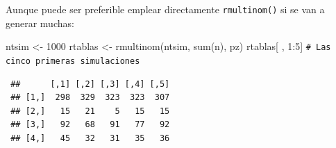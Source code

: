 \documentclass[
]{book}
\newenvironment{Shaded}{\begin{snugshade}}{\end{snugshade}}
\newcommand{\CommentTok}[1]{\textcolor[rgb]{0.56,0.35,0.01}{\textit{#1}}}
\newcommand{\DecValTok}[1]{\textcolor[rgb]{0.00,0.00,0.81}{#1}}
\newcommand{\FunctionTok}[1]{\textcolor[rgb]{0.00,0.00,0.00}{#1}}
\newcommand{\NormalTok}[1]{#1}
\newcommand{\OtherTok}[1]{\textcolor[rgb]{0.56,0.35,0.01}{#1}}
\newcommand{\SpecialCharTok}[1]{\textcolor[rgb]{0.00,0.00,0.00}{#1}}
\theoremstyle{break}
\theoremstyle{nonumberplain}
\renewcommand{\CommentTok}[1]{\textcolor[rgb]{0.41,0.41,0.41}{\texttt{#1}}}
\begin{document}
Aunque puede ser preferible emplear directamente \texttt{rmultinom()} si se van a generar muchas:

\begin{Shaded}
\begin{Highlighting}[]
\NormalTok{ntsim }\OtherTok{\textless{}{-}} \DecValTok{1000}
\NormalTok{rtablas }\OtherTok{\textless{}{-}} \FunctionTok{rmultinom}\NormalTok{(ntsim, }\FunctionTok{sum}\NormalTok{(n), pz)}
\NormalTok{rtablas[ , }\DecValTok{1}\SpecialCharTok{:}\DecValTok{5}\NormalTok{] }\CommentTok{\# Las cinco primeras simulaciones}
\end{Highlighting}
\end{Shaded}

\begin{verbatim}
 ##      [,1] [,2] [,3] [,4] [,5]
 ## [1,]  298  329  323  323  307
 ## [2,]   15   21    5   15   15
 ## [3,]   92   68   91   77   92
 ## [4,]   45   32   31   35   36
\end{verbatim}
\end{document}
